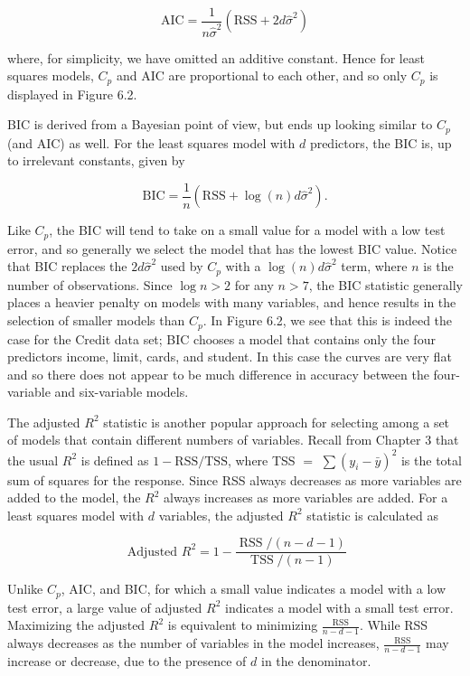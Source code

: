 \documentclass[10pt]{article}
\begin{document}
$$
\mathrm{AIC}=\frac{1}{n \hat{\sigma}^{2}}\left(\mathrm{RSS}+2 d \hat{\sigma}^{2}\right)
$$

where, for simplicity, we have omitted an additive constant. Hence for least squares models, $C_{p}$ and AIC are proportional to each other, and so only $C_{p}$ is displayed in Figure 6.2.

BIC is derived from a Bayesian point of view, but ends up looking similar to $C_{p}$ (and AIC) as well. For the least squares model with $d$ predictors, the BIC is, up to irrelevant constants, given by


\begin{equation*}
\mathrm{BIC}=\frac{1}{n}\left(\mathrm{RSS}+\log (n) d \hat{\sigma}^{2}\right) . \tag{6.3}
\end{equation*}


Like $C_{p}$, the BIC will tend to take on a small value for a model with a low test error, and so generally we select the model that has the lowest BIC value. Notice that BIC replaces the $2 d \hat{\sigma}^{2}$ used by $C_{p}$ with a $\log (n) d \hat{\sigma}^{2}$ term, where $n$ is the number of observations. Since $\log n>2$ for any $n>7$, the BIC statistic generally places a heavier penalty on models with many variables, and hence results in the selection of smaller models than $C_{p}$. In Figure 6.2, we see that this is indeed the case for the Credit data set; BIC chooses a model that contains only the four predictors income, limit, cards, and student. In this case the curves are very flat and so there does not appear to be much difference in accuracy between the four-variable and six-variable models.

The adjusted $R^{2}$ statistic is another popular approach for selecting among a set of models that contain different numbers of variables. Recall from Chapter 3 that the usual $R^{2}$ is defined as $1-\mathrm{RSS} / \mathrm{TSS}$, where TSS $=$ $\sum\left(y_{i}-\bar{y}\right)^{2}$ is the total sum of squares for the response. Since RSS always decreases as more variables are added to the model, the $R^{2}$ always increases as more variables are added. For a least squares model with $d$ variables, the adjusted $R^{2}$ statistic is calculated as


\begin{equation*}
\text { Adjusted } R^{2}=1-\frac{\operatorname{RSS} /(n-d-1)}{\operatorname{TSS} /(n-1)} \tag{6.4}
\end{equation*}


Unlike $C_{p}$, AIC, and BIC, for which a small value indicates a model with a low test error, a large value of adjusted $R^{2}$ indicates a model with a small test error. Maximizing the adjusted $R^{2}$ is equivalent to minimizing $\frac{\text { RSS }}{n-d-1}$. While RSS always decreases as the number of variables in the model increases, $\frac{\mathrm{RSS}}{n-d-1}$ may increase or decrease, due to the presence of $d$ in the denominator.
\end{document}
